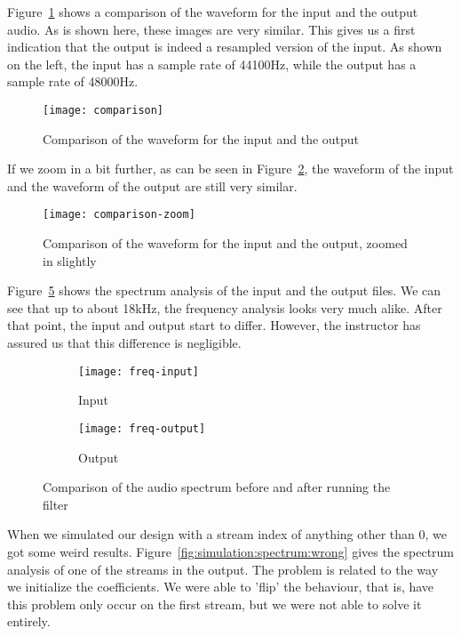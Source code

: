 Figure~\ref{fig:simulation:waveform} shows a comparison of the waveform for the input and the output audio.
As is shown here, these images are very similar.
This gives us a first indication that the output is indeed a resampled version of the input.
As shown on the left, the input has a sample rate of 44100Hz, while the output has a sample rate of 48000Hz.

\begin{figure}[H]
	\centering
	\texttt{[image: comparison]}
	\caption{Comparison of the waveform for the input and the output}
	\label{fig:simulation:waveform}
\end{figure}

If we zoom in a bit further, as can be seen in Figure~\ref{fig:simulation:waveformzoom}, the waveform of the input and the waveform of the output are still very similar.

\begin{figure}[H]
	\centering
	\texttt{[image: comparison-zoom]}
	\caption{Comparison of the waveform for the input and the output, zoomed in slightly}
	\label{fig:simulation:waveformzoom}
\end{figure}

Figure~\ref{fig:simulation:spectrum} shows the spectrum analysis of the input and the output files.
We can see that up to about 18kHz, the frequency analysis looks very much alike.
After that point, the input and output start to differ.
However, the instructor has assured us that this difference is negligible.

\begin{figure}[H]
	\centering
	\begin{subfigure}[l]{0.7\textwidth}
		\texttt{[image: freq-input]}
		\caption{Input}
		\label{fig:simulation:spectrum:before}
	\end{subfigure}

	\begin{subfigure}[l]{0.7\textwidth}
		\texttt{[image: freq-output]}
		\caption{Output}
		\label{fig:simulation:spectrum:after}
	\end{subfigure}

	\caption{Comparison of the audio spectrum before and after running the filter}
	\label{fig:simulation:spectrum}
\end{figure}

When we simulated our design with a stream index of anything other than 0, we got some weird results.
Figure~\ref{fig:simulation:spectrum:wrong} gives the spectrum analysis of one of the streams in the output.
The problem is related to the way we initialize the coefficients.
We were able to 'flip' the behaviour, that is, have this problem only occur on the first stream, but we were not able to solve it entirely.


